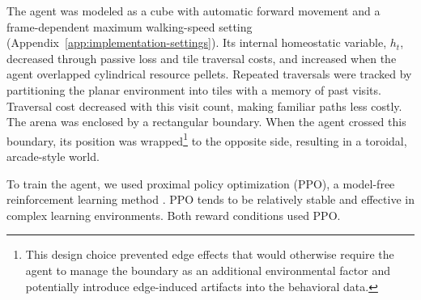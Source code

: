 \documentclass[12pt,fleqn]{article}
\begin{document}
The agent was modeled as a cube with automatic forward movement and a frame-dependent maximum walking-speed setting (Appendix~\ref{app:implementation-settings}). Its internal homeostatic variable, $h_t$, decreased through passive loss and tile traversal costs, and increased when the agent overlapped cylindrical resource pellets. Repeated traversals were tracked by partitioning the planar environment into tiles with a memory of past visits. Traversal cost decreased with this visit count, making familiar paths less costly. The arena was enclosed by a rectangular boundary. When the agent crossed this boundary, its position was wrapped\footnote{This design choice prevented edge effects that would otherwise require the agent to manage the boundary as an additional environmental factor and potentially introduce edge-induced artifacts into the behavioral data.} to the opposite side, resulting in a toroidal, arcade-style world.

To train the agent, we used proximal policy optimization (PPO), a model-free reinforcement learning method \cite{schulman_proximal_2017}. PPO tends to be relatively stable and effective in complex learning environments. Both reward conditions used PPO.

\end{document}
